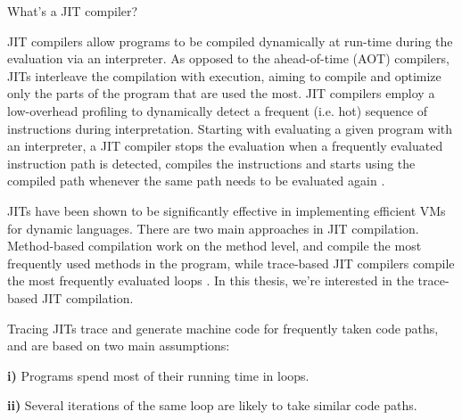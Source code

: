     \begin{paragraph-here}
        What's a JIT compiler?

        JIT compilers allow programs to be compiled dynamically at run-time
        during the evaluation via an interpreter. As opposed to the
        ahead-of-time (AOT) compilers, JITs interleave the compilation with
        execution, aiming to compile and optimize only the parts of the
        program that are used the most. JIT compilers employ a low-overhead
        profiling to dynamically detect a frequent (i.e. hot) sequence of
        instructions during interpretation. Starting with evaluating a given
        program with an interpreter, a JIT compiler stops the evaluation when
        a frequently evaluated instruction path is detected, compiles the
        instructions and starts using the compiled path whenever the same path
        needs to be evaluated again \cite{dynamo}.
    \end{paragraph-here}

    \begin{paragraph-here}
            JITs have been shown to be significantly effective in implementing
            efficient VMs for dynamic languages. There are two main approaches in
            JIT compilation. Method-based compilation work on the method level,
            and compile the most frequently used methods in the program, while
            trace-based JIT compilers compile the most frequently evaluated loops
            \cite{survey:05,jit-history:03}. In this thesis, we're interested in
            the trace-based JIT compilation.

            Tracing JITs trace and generate machine code for frequently taken code paths, and are based on two main assumptions:

            \textbf{i)} Programs spend most of their running time in loops.

            \textbf{ii)} Several iterations of the same loop are likely to take
            similar code paths. \cite{pypy-main}
    \end{paragraph-here}

